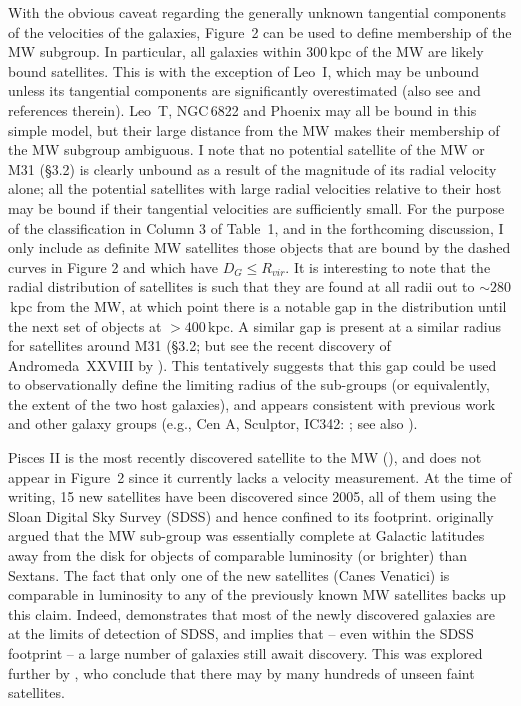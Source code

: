 \documentclass[manuscript]{aastex}
\begin{document}
With the obvious caveat regarding the generally unknown tangential
components of the velocities of the galaxies, Figure~2 can be used to
define membership of the MW subgroup. In particular, all galaxies
within 300\,kpc of the MW are likely bound satellites. This is with
the exception of Leo~I, which may be unbound unless its tangential
components are significantly overestimated (also see
\citealt{mateo2008,sohn2007,zaritsky1989} and references
therein). Leo~T, NGC\,6822 and Phoenix may all be bound in this simple
model, but their large distance from the MW makes their membership of
the MW subgroup ambiguous. I note that no potential satellite of the
MW or M31 (\S3.2) is clearly unbound as a result of the magnitude of
its radial velocity alone; all the potential satellites with large
radial velocities relative to their host may be bound if their
tangential velocities are sufficiently small. For the purpose of the
classification in Column 3 of Table~1, and in the forthcoming
discussion, I only include as definite MW satellites those objects
that are bound by the dashed curves in Figure 2 and which have $D_G
\le R_{vir}$. It is
interesting to note that the radial distribution of satellites is such
that they are found at all radii out to $\sim 280$\,kpc from the MW,
at which point there is a notable gap in the distribution until the
next set of objects at $> 400$\,kpc. A similar gap is present at a
similar radius for satellites around M31 (\S3.2; but see the recent
discovery of Andromeda~XXVIII by \citealt{slater2011}). This tentatively
suggests that this gap could be used to observationally define the
limiting radius of the sub-groups (or equivalently, the extent of the
two host galaxies), and appears consistent with previous work and
other galaxy groups (e.g., Cen A, Sculptor, IC342:
\citealt{karachentsev2002b,karachentsev2003a,karachentsev2003b}; see
also \citealt{grebel2003}).

Pisces II is the most recently discovered satellite to the MW
(\citealt{belokurov2010}), and does not appear in Figure~2 since it
currently lacks a velocity measurement. At the time of writing, 15 new
satellites have been discovered since 2005, all of them using the
Sloan Digital Sky Survey (SDSS) and hence confined to its
footprint. \cite{irwin1994} originally argued that the MW sub-group
was essentially complete at Galactic latitudes away from the disk for
objects of comparable luminosity (or brighter) than Sextans. The fact
that only one of the new satellites (Canes Venatici) is comparable in
luminosity to any of the previously known MW satellites backs up this
claim. Indeed, \cite{koposov2008} demonstrates that most of the newly
discovered galaxies are at the limits of detection of SDSS, and
implies that -- even within the SDSS footprint -- a large number of
galaxies still await discovery. This was explored further by
\cite{tollerud2008}, who conclude that there may by many hundreds
of unseen faint satellites.
\end{document}
